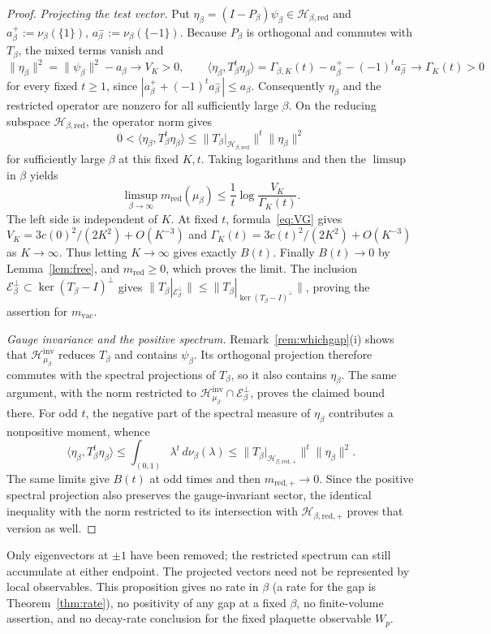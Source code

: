 \documentclass[11pt,a4paper]{article}
\theoremstyle{plain}
\theoremstyle{definition}
\theoremstyle{remark}
\numberwithin{equation}{section}
\newcommand{\cH}{\mathcal{H}}
\begin{document}
\begin{proof}
\emph{Projecting the test vector.}
Put $\eta_\beta=(I-P_\beta)\psi_\beta\in\cH_{\beta,\mathrm{red}}$ and
$a_\beta^+:=\nu_\beta(\{1\})$, $a_\beta^-:=\nu_\beta(\{-1\})$.
Because $P_\beta$ is orthogonal and commutes with $T_\beta$, the mixed terms vanish and
\[
\|\eta_\beta\|^2=\|\psi_\beta\|^2-a_\beta\longrightarrow V_K>0,
\qquad
\langle\eta_\beta,T_\beta^t\eta_\beta\rangle
=\Gamma_{\beta,K}(t)-a_\beta^+-(-1)^t a_\beta^-\longrightarrow\Gamma_K(t)>0
\]
for every fixed $t\ge1$, since $|a_\beta^++(-1)^t a_\beta^-|\le a_\beta$.
Consequently $\eta_\beta$ and the restricted operator are nonzero for all sufficiently large $\beta$.
On the reducing subspace $\cH_{\beta,\mathrm{red}}$, the operator norm gives
\[
0<\langle\eta_\beta,T_\beta^t\eta_\beta\rangle
\le\|T_\beta|_{\cH_{\beta,\mathrm{red}}}\|^t\|\eta_\beta\|^2
\]
for sufficiently large $\beta$ at this fixed $K,t$. Taking logarithms and then the $\limsup$ in $\beta$ yields
\[
\limsup_{\beta\to\infty}m_{\mathrm{red}}(\mu_\beta)
\le\frac1t\log\frac{V_K}{\Gamma_K(t)}.
\]
The left side is independent of $K$. At fixed $t$, formula~\eqref{eq:VG} gives
$V_K=3c(0)^2/(2K^2)+O(K^{-3})$ and $\Gamma_K(t)=3c(t)^2/(2K^2)+O(K^{-3})$ as $K\to\infty$.
Thus letting $K\to\infty$ gives exactly $B(t)$.
Finally $B(t)\to0$ by Lemma~\ref{lem:free}, and $m_{\mathrm{red}}\ge0$, which proves the limit.
The inclusion $\mathcal E_\beta^\perp\subset\ker(T_\beta-I)^\perp$ gives
$\|T_\beta|_{\mathcal E_\beta^\perp}\|\le\|T_\beta|_{\ker(T_\beta-I)^\perp}\|$, proving the assertion for $m_{\mathrm{vac}}$.

\emph{Gauge invariance and the positive spectrum.}
Remark~\ref{rem:whichgap}(i) shows that $\cH^{\mathrm{inv}}_{\mu_\beta}$ reduces $T_\beta$ and contains $\psi_\beta$.
Its orthogonal projection therefore commutes with the spectral projections of $T_\beta$, so it also contains $\eta_\beta$.
The same argument, with the norm restricted to $\cH^{\mathrm{inv}}_{\mu_\beta}\cap\mathcal E_\beta^\perp$, proves the claimed bound there.
For odd $t$, the negative part of the spectral measure of $\eta_\beta$ contributes a nonpositive moment, whence
\[
\langle\eta_\beta,T_\beta^t\eta_\beta\rangle
\le\int_{(0,1)}\lambda^t\,d\nu_\beta(\lambda)
\le\|T_\beta|_{\cH_{\beta,\mathrm{red},+}}\|^t\|\eta_\beta\|^2.
\]
The same limits give $B(t)$ at odd times and then $m_{\mathrm{red},+}\to0$.
Since the positive spectral projection also preserves the gauge-invariant sector, the identical inequality with the norm restricted
to its intersection with $\cH_{\beta,\mathrm{red},+}$ proves that version as well.
\end{proof}
Only eigenvectors at $\pm1$ have been removed; the restricted spectrum can still accumulate at either endpoint.
The projected vectors need not be represented by local observables. This proposition gives no rate in $\beta$ (a rate for the gap is Theorem~\ref{thm:rate}), no positivity of any
gap at a fixed $\beta$, no finite-volume assertion, and no decay-rate conclusion for the fixed plaquette observable $W_p$.
\end{document}
